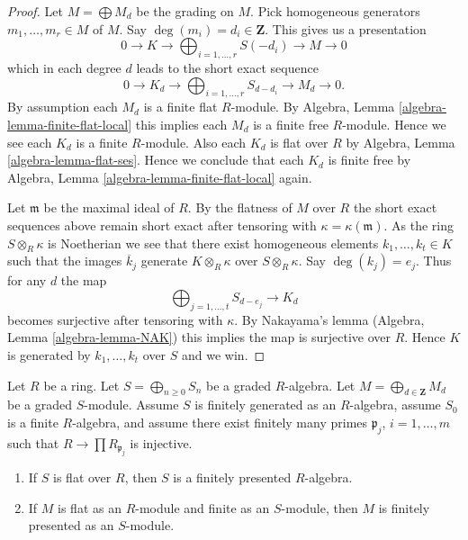 \begin{proof}
Let $M = \bigoplus M_d$ be the grading on $M$.
Pick homogeneous generators $m_1, \ldots, m_r \in M$ of $M$.
Say $\deg(m_i) = d_i \in \mathbf{Z}$. This gives us a presentation
$$
0 \to K \to \bigoplus\nolimits_{i = 1, \ldots, r} S(-d_i) \to M \to 0
$$
which in each degree $d$ leads to the short exact sequence
$$
0 \to K_d \to \bigoplus\nolimits_{i = 1, \ldots, r} S_{d - d_i} \to
M_d \to 0.
$$
By assumption each $M_d$ is a finite flat $R$-module. By
Algebra, Lemma \ref{algebra-lemma-finite-flat-local}
this implies each $M_d$ is a finite free $R$-module. Hence
we see each $K_d$ is a finite $R$-module. Also each $K_d$ is flat
over $R$ by
Algebra, Lemma \ref{algebra-lemma-flat-ses}.
Hence we conclude that each $K_d$ is finite free by
Algebra, Lemma \ref{algebra-lemma-finite-flat-local}
again.

\medskip\noindent
Let $\mathfrak m$ be the maximal ideal of $R$. By the flatness of $M$
over $R$ the short exact sequences above remain short exact after tensoring
with $\kappa = \kappa(\mathfrak m)$. As the ring $S \otimes_R \kappa$ is
Noetherian we see that there exist homogeneous elements
$k_1, \ldots, k_t \in K$ such that the images $\overline{k}_j$
generate $K \otimes_R \kappa$ over $S \otimes_R \kappa$. Say $\deg(k_j) = e_j$.
Thus for any $d$ the map
$$
\bigoplus\nolimits_{j = 1, \ldots, t} S_{d - e_j}
\longrightarrow
K_d
$$
becomes surjective after tensoring with $\kappa$. By
Nakayama's lemma
(Algebra, Lemma \ref{algebra-lemma-NAK})
this implies the map is surjective over $R$. Hence $K$ is generated
by $k_1, \ldots, k_t$ over $S$ and we win.
\end{proof}

\begin{lemma}
\label{lemma-flat-graded-finite-type-finite-presentation}
Let $R$ be a ring. Let $S = \bigoplus_{n \geq 0} S_n$ be a graded $R$-algebra.
Let $M = \bigoplus_{d \in \mathbf{Z}} M_d$ be a graded $S$-module.
Assume $S$ is finitely generated as an $R$-algebra, assume $S_0$ is a finite
$R$-algebra, and assume there exist finitely many primes
$\mathfrak p_j$, $i = 1, \ldots, m$ such that
$R \to \prod R_{\mathfrak p_j}$ is injective.
\begin{enumerate}
\item If $S$ is flat over $R$, then $S$ is a finitely presented $R$-algebra.
\item If $M$ is flat as an $R$-module and finite as an $S$-module,
then $M$ is finitely presented as an $S$-module.
\end{enumerate}
\end{lemma}

